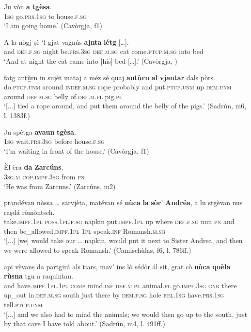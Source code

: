 \ea
\label{ex:a1}
\gll Ju vòn \textbf{a} \textbf{tgèsa}.\\
\textsc{1sg} go.\textsc{prs.1sg} to house.\textsc{f.sg}\\
\glt `I am going home.' (Cavòrgja, f1)
\z

\ea
\label{ex:ajnta1}
\gll A la nògj ṣè `l gjat vagnús \textbf{ajnta} \textbf{létg} […].\\
and \textsc{def.f.sg} night be.\textsc{prs.3sg} \textsc{def.m.sg} cat come.\textsc{ptcp.m.sg} into bed\\
\glt `And at night the cat came into [his] bed […].' (Cavòrgja, \citealt[121]{Büchli1966})
\z

\ea
\label{ex:anturn1}
\gll    [...] fatg antù̱rn in sujèt mataj a méz sé quaj \textbf{antù̱rn} \textbf{al} \textbf{vjantar} dals pòrs.\\
{} do.\textsc{ptcp.unm} around \textsc{indef.m.sg} rope probably and put.\textsc{ptcp.unm} up  \textsc{dem.unm} around \textsc{def.m.sg} belly of.\textsc{def.m.pl} pig.\textsc{pl} \\
\glt `[...] tied a rope around, and put them around the belly of the pigs.' (Sadrún, m6, l. 1383f.)
\z

\ea
\label{ex:avaun1}
\gll Ju spétga \textbf{avaun} \textbf{tgèsa}.\\
\textsc{1sg} wait\textsc{.prs.3sg} before house.\textsc{f.sg}\\
\glt `I'm waiting in front of the house.' (Cavòrgja, f1)
\z

\ea
\label{ex:da1}
\gll Èl èra \textbf{da} \textbf{Zarcúns}.\\
\textsc{3sg.m} \textsc{cop.impf.3sg} from \textsc{pn}\\
\glt `He was from Zarcuns.' (Zarcúns, m2)
\z


\ea
\label{ex:nuca1}
\gll [...] prandévan nòssa … sarvjèta, matévan sé \textbf{nùca} \textbf{la} \textbf{sòr}’ \textbf{Andréa}, a lu stgèvan nus raṣdá ròmòntsch.\\
{} take.\textsc{impf.1pl} \textsc{poss.1pl.f.sg} {} napkin put.\textsc{impf.1pl} up  where \textsc{def.f.sg} nun \textsc{pn} and then be\_allowed.\textsc{impf.1pl} \textsc{1pl} speak.\textsc{inf} Romansh.\textsc{m.sg}\\
\glt `[...] [we] would take our … napkin, would put it next to Sister Andrea, and then we were allowed to speak Romansh.' (Camischùlas, f6, l. 786ff.)
\z

\ea
\label{ex:nuca2}
\gll [...] api vèvanṣ da partgirá als tiars, mav’ ins lò sédòr ál sit, grat cò \textbf{nùca} \textbf{quèla} \textbf{rùsna} tgu a raquintau.\\
{} and have.\textsc{impf.1pl.1pl} \textsc{comp} mind.\textsc{inf} \textsc{def.m.pl} animal.\textsc{pl} go.\textsc{impf.3sg} \textsc{gnr} there up\_out in.\textsc{def.m.sg} south just there by \textsc{dem.f.sg} hole \textsc{rel.1sg} have.\textsc{prs.1sg} tell.\textsc{ptcp.unm}\\  
\glt `[...] and we also had to mind the animals; we would then go up to the south, just by that cave I have told about.' (Sadrún, m4, l. 491ff.)
\z


